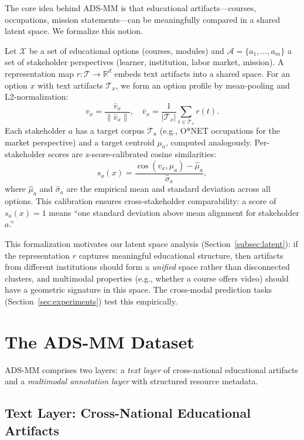 \documentclass[sigconf,review]{acmart}
\newcommand{\ADSMM}{\textsc{ADS-MM}\xspace}
\begin{document}
The core idea behind \ADSMM is that educational artifacts---courses, occupations, mission statements---can be meaningfully compared in a shared latent space.
We formalize this notion.

Let $\mathcal{X}$ be a set of educational options (courses, modules) and $\mathcal{A} = \{a_1, \dots, a_m\}$ a set of stakeholder perspectives (learner, institution, labor market, mission).
A representation map $r: \mathcal{T} \to \mathbb{R}^d$ embeds text artifacts into a shared space.
For an option $x$ with text artifacts $\mathcal{T}_x$, we form an option profile by mean-pooling and L2-normalization:
\begin{equation}
  v_x = \frac{\bar{v}_x}{\|\bar{v}_x\|}, \quad \bar{v}_x = \frac{1}{|\mathcal{T}_x|}\sum_{t \in \mathcal{T}_x} r(t).
\end{equation}
Each stakeholder $a$ has a target corpus $\mathcal{T}_a$ (e.g., O*NET occupations for the market perspective) and a target centroid $\mu_a$, computed analogously.
Per-stakeholder scores are z-score-calibrated cosine similarities:
\begin{equation}
  s_a(x) = \frac{\cos(v_x, \mu_a) - \hat{\mu}_a}{\hat{\sigma}_a},
\end{equation}
where $\hat{\mu}_a$ and $\hat{\sigma}_a$ are the empirical mean and standard deviation across all options.
This calibration ensures cross-stakeholder comparability: a score of $s_a(x) = 1$ means ``one standard deviation above mean alignment for stakeholder $a$.''

This formalization motivates our latent space analysis (Section~\ref{subsec:latent}): if the representation $r$ captures meaningful educational structure, then artifacts from different institutions should form a \emph{unified} space rather than disconnected clusters, and multimodal properties (e.g., whether a course offers video) should have a geometric signature in this space.
The cross-modal prediction tasks (Section~\ref{sec:experiments}) test this empirically.


\section{The ADS-MM Dataset}
\label{sec:dataset}

\ADSMM comprises two layers: a \emph{text layer} of cross-national educational artifacts and a \emph{multimodal annotation layer} with structured resource metadata.

\subsection{Text Layer: Cross-National Educational Artifacts}
\label{subsec:text-layer}
\end{document}
